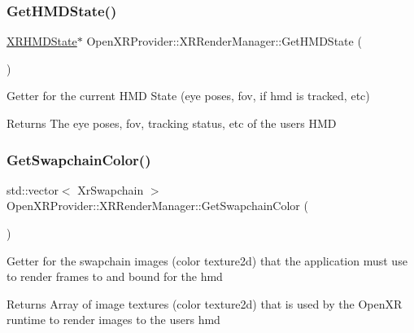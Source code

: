 \subsubsection{\texorpdfstring{GetHMDState()}{GetHMDState()}}
{\footnotesize\ttfamily \mbox{\hyperlink{struct_open_x_r_provider_1_1_x_r_h_m_d_state}{X\+R\+H\+M\+D\+State}}$\ast$ Open\+X\+R\+Provider\+::\+X\+R\+Render\+Manager\+::\+Get\+H\+M\+D\+State (\begin{DoxyParamCaption}{ }\end{DoxyParamCaption})\hspace{0.3cm}{\ttfamily [inline]}}

Getter for the current H\+MD State (eye poses, fov, if hmd is tracked, etc) \begin{DoxyReturn}{Returns}
The eye poses, fov, tracking status, etc of the user\textquotesingle{}s H\+MD 
\end{DoxyReturn}
\mbox{\label{class_open_x_r_provider_1_1_x_r_render_manager_ae97da10203b51fe701ccd57b4299bc9b}} 
\subsubsection{\texorpdfstring{GetSwapchainColor()}{GetSwapchainColor()}}
{\footnotesize\ttfamily std\+::vector$<$ Xr\+Swapchain $>$ Open\+X\+R\+Provider\+::\+X\+R\+Render\+Manager\+::\+Get\+Swapchain\+Color (\begin{DoxyParamCaption}{ }\end{DoxyParamCaption})\hspace{0.3cm}{\ttfamily [inline]}}

Getter for the swapchain images (color texture2d) that the application must use to render frames to and bound for the hmd \begin{DoxyReturn}{Returns}
Array of image textures (color texture2d) that is used by the Open\+XR runtime to render images to the user\textquotesingle{}s hmd 
\end{DoxyReturn}
\mbox{\label{class_open_x_r_provider_1_1_x_r_render_manager_a0835882f612c14539f3226425b398bcb}} 
